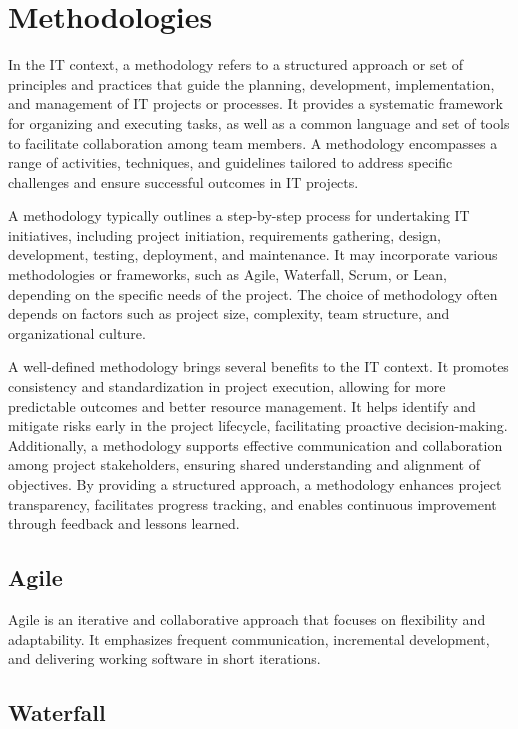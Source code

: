 \chapter{Methodologies}

In the IT context, a methodology refers to a structured approach or set of principles and practices that guide the planning, development, implementation, and management of IT projects or processes. It provides a systematic framework for organizing and executing tasks, as well as a common language and set of tools to facilitate collaboration among team members. A methodology encompasses a range of activities, techniques, and guidelines tailored to address specific challenges and ensure successful outcomes in IT projects.

A methodology typically outlines a step-by-step process for undertaking IT initiatives, including project initiation, requirements gathering, design, development, testing, deployment, and maintenance. It may incorporate various methodologies or frameworks, such as Agile, Waterfall, Scrum, or Lean, depending on the specific needs of the project. The choice of methodology often depends on factors such as project size, complexity, team structure, and organizational culture.

A well-defined methodology brings several benefits to the IT context. It promotes consistency and standardization in project execution, allowing for more predictable outcomes and better resource management. It helps identify and mitigate risks early in the project lifecycle, facilitating proactive decision-making. Additionally, a methodology supports effective communication and collaboration among project stakeholders, ensuring shared understanding and alignment of objectives. By providing a structured approach, a methodology enhances project transparency, facilitates progress tracking, and enables continuous improvement through feedback and lessons learned.

\section{Agile}

Agile is an iterative and collaborative approach that focuses on flexibility and adaptability. It emphasizes frequent communication, incremental development, and delivering working software in short iterations.

\section{Waterfall}

